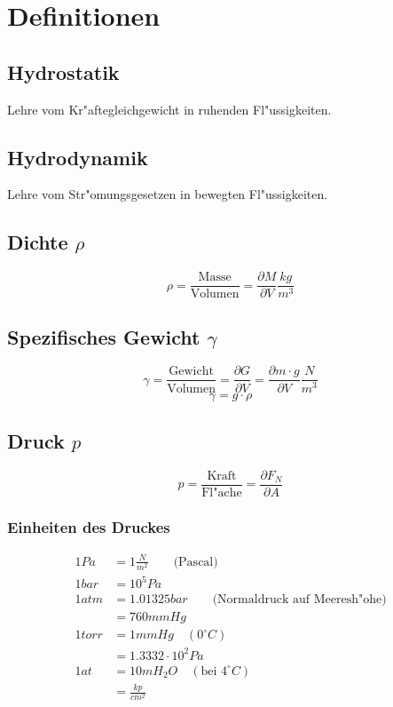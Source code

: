 %
%

\section{Definitionen}

\subsection{Hydrostatik}
Lehre vom Kr"aftegleichgewicht in ruhenden Fl"ussigkeiten.

\subsection{Hydrodynamik}
Lehre vom Str"omungsgesetzen in bewegten Fl"ussigkeiten.

\subsection{Dichte $\rho$}
\begin{equation}
	\rho=\frac{\text{Masse}}{\text{Volumen}}=\frac{\partial M}{\partial V}\unit{\frac{kg}{m^3}}
\end{equation}

\subsection{Spezifisches Gewicht $\gamma$}
\begin{equation}
	\gamma=\frac{\text{Gewicht}}{\text{Volumen}}=\frac{\partial G}{\partial V}=\frac{\partial m\cdot g}{\partial V}\unit{\frac{N}{m^3}}
\end{equation}
\begin{equation}
	\gamma=g\cdot\rho
\end{equation}

\subsection{Druck $p$}
\begin{equation}
	p=\frac{\text{Kraft}}{\text{Fl"ache}}=\frac{\partial F_N}{\partial A}
\end{equation}

\subsubsection{Einheiten des Druckes}
\begin{align*}
	1 Pa &= 1\frac{N}{m^2}\qquad\text{(Pascal)} \\
	1 bar &= 10^5 Pa \\
	1 atm &= 1.01325 bar\qquad\text{(Normaldruck auf Meeresh"ohe)} \\
		&= 760mm Hg \\
	1 torr &= 1mm Hg\quad (0^{\circ}C) \\
		&= 1.3332\cdot 10^2 Pa \\
	1 at &= 10m H_2O\quad ( \text{bei } 4^{\circ}C) \\
		&= \frac{kp}{cm^2}
\end{align*}

